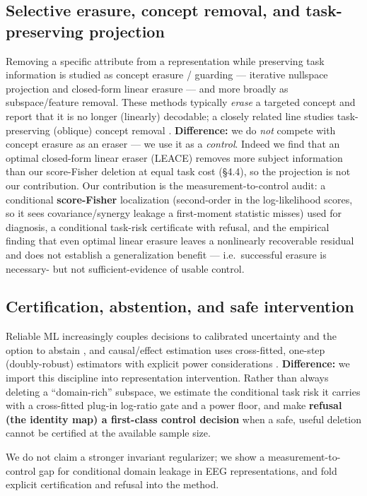 \subsection{Selective erasure, concept removal, and task-preserving projection}
Removing a specific attribute from a representation while preserving task information is studied as concept
erasure / guarding --- iterative nullspace projection and closed-form linear erasure
\citep{ravfogel2020inlp,ravfogel2022rlace,belrose2023leace} --- and more broadly as subspace/feature removal. These methods typically
\emph{erase} a targeted concept and report that it is no longer (linearly) decodable; a closely related
line studies task-preserving (oblique) concept removal \citep{holstege2025taskpreserving}.
\textbf{Difference:} we do \emph{not} compete with concept erasure as an eraser --- we use it as a
\emph{control}. Indeed we find that an optimal closed-form linear eraser (LEACE) removes more subject
information than our score-Fisher deletion at equal task cost (\S4.4), so the projection is not our
contribution. Our contribution is the measurement-to-control audit: a conditional \textbf{score-Fisher}
localization (second-order in the log-likelihood scores, so it sees covariance/synergy leakage a
first-moment statistic misses) used for diagnosis, a conditional task-risk certificate with refusal, and
the empirical finding that even optimal linear erasure leaves a nonlinearly recoverable residual and does
not establish a generalization benefit --- i.e.\ successful erasure is necessary- but not
sufficient-evidence of usable control.

\subsection{Certification, abstention, and safe intervention}
Reliable ML increasingly couples decisions to calibrated uncertainty and the option to abstain
\citep{geifman2017selective,geifman2019selectivenet,shafer2008conformal}, and causal/effect
estimation uses cross-fitted, one-step (doubly-robust) estimators with explicit power considerations
\citep{chernozhukov2018doubleml}.
\textbf{Difference:} we import this discipline into representation intervention. Rather than always deleting a
``domain-rich'' subspace, we estimate the conditional task risk it carries with a cross-fitted plug-in
log-ratio gate and a power floor, and make \textbf{refusal (the identity map) a first-class control decision}
when a safe, useful deletion cannot be certified at the available sample size.

We do not claim a stronger invariant regularizer; we show a measurement-to-control gap for conditional
domain leakage in EEG representations, and fold explicit certification and refusal into the method.
